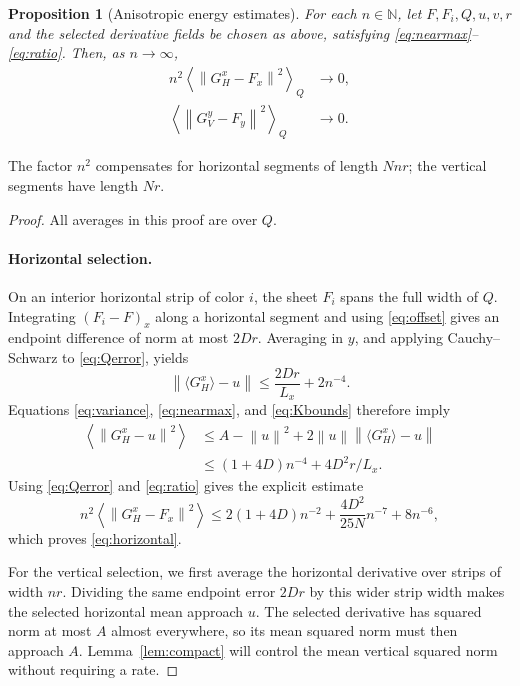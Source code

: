\documentclass[11pt]{article}
\newtheorem{proposition}[theorem]{Proposition}
\newcommand{\N}{\mathbb N}
\newcommand{\norm}[1]{\left\lVert#1\right\rVert}
\begin{document}
\begin{proposition}[Anisotropic energy estimates]\label{prop:energy}
For each $n\in\N$, let $F,F_i,Q,u,v,r$ and the selected derivative fields be chosen as above, satisfying \eqref{eq:nearmax}--\eqref{eq:ratio}. Then, as $n\to\infty$,
\begin{align}
 n^2\left\langle\norm{G_H^x-F_x}^2\right\rangle_Q&\longrightarrow0,\label{eq:horizontal}\\
 \left\langle\norm{G_V^y-F_y}^2\right\rangle_Q&\longrightarrow0.\label{eq:vertical}
\end{align}
\end{proposition}
The factor $n^2$ compensates for horizontal segments of length $Nnr$; the vertical segments have length $Nr$.
\begin{proof}
All averages in this proof are over $Q$.

\paragraph{Horizontal selection.}
On an interior horizontal strip of color $i$, the sheet $F_i$ spans the full width of $Q$. Integrating $(F_i-F)_x$ along a horizontal segment and using \eqref{eq:offset} gives an endpoint difference of norm at most $2Dr$. Averaging in $y$, and applying Cauchy--Schwarz to \eqref{eq:Qerror}, yields
\begin{equation}\label{eq:Hmean}
 \norm{\langle G_H^x\rangle-u}
 \le\frac{2Dr}{L_x}+2n^{-4}.
\end{equation}
Equations \eqref{eq:variance}, \eqref{eq:nearmax}, and \eqref{eq:Kbounds} therefore imply
\begin{align*}
 \left\langle\norm{G_H^x-u}^2\right\rangle
 &\le A-\norm u^2+2\norm u\norm{\langle G_H^x\rangle-u}\\
 &\le(1+4D)n^{-4}+4D^2r/L_x.
\end{align*}
Using \eqref{eq:Qerror} and \eqref{eq:ratio} gives the explicit estimate
\begin{equation}\label{eq:Hrate}
 n^2\left\langle\norm{G_H^x-F_x}^2\right\rangle
 \le 2(1+4D)n^{-2}+\frac{4D^2}{25N}n^{-7}+8n^{-6},
\end{equation}
which proves \eqref{eq:horizontal}.

For the vertical selection, we first average the horizontal derivative over strips of width $nr$. Dividing the same endpoint error $2Dr$ by this wider strip width makes the selected horizontal mean approach $u$. The selected derivative has squared norm at most $A$ almost everywhere, so its mean squared norm must then approach $A$. Lemma~\ref{lem:compact} will control the mean vertical squared norm without requiring a rate.


\end{proof}
\end{document}
